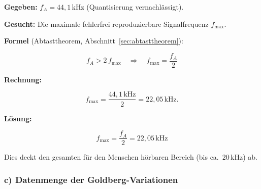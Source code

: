 \begin{beispiel}

\textbf{Gegeben:} $f_A = 44{,}1\,\text{kHz}$ (Quantisierung vernachlässigt).

\textbf{Gesucht:} Die maximale fehlerfrei reproduzierbare Signalfrequenz
$f_{\max}$.

\textbf{Formel} (Abtasttheorem, Abschnitt~\ref{sec:abtasttheorem}):

$$
f_A > 2\, f_{\max} \quad\Longrightarrow\quad f_{\max} = \frac{f_A}{2}
$$

\textbf{Rechnung:}

$$
f_{\max} = \frac{44{,}1\,\text{kHz}}{2} = 22{,}05\,\text{kHz}.
$$

\textbf{Lösung:}

$$
\boxed{\;f_{\max} = \frac{f_A}{2} = 22{,}05\,\text{kHz}\;}
$$

Dies deckt den gesamten für den Menschen hörbaren Bereich (bis ca.\ $20\,\text{kHz}$) ab.

\end{beispiel}

\subsubsection*{c) Datenmenge der Goldberg-Variationen}

